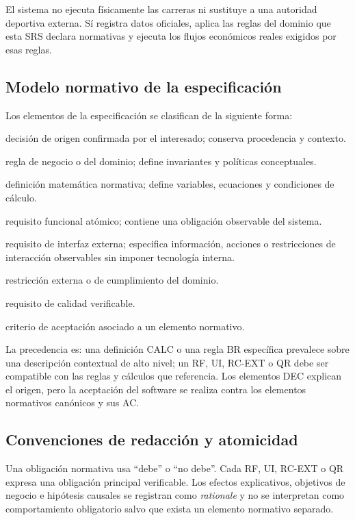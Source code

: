 \documentclass[10pt,letterpaper]{article}
\begin{document}
El sistema no ejecuta físicamente las carreras ni sustituye a una autoridad deportiva externa. Sí registra datos oficiales, aplica las reglas del dominio que esta SRS declara normativas y ejecuta los flujos económicos reales exigidos por esas reglas.

\subsection{Modelo normativo de la especificación}
Los elementos de la especificación se clasifican de la siguiente forma:
\begin{description}[style=nextline,leftmargin=2.8cm,labelwidth=2.45cm]
\item[DEC] decisión de origen confirmada por el interesado; conserva procedencia y contexto.
\item[BR] regla de negocio o del dominio; define invariantes y políticas conceptuales.
\item[CALC] definición matemática normativa; define variables, ecuaciones y condiciones de cálculo.
\item[RF] requisito funcional atómico; contiene una obligación observable del sistema.
\item[UI] requisito de interfaz externa; especifica información, acciones o restricciones de interacción observables sin imponer tecnología interna.
\item[RC-EXT] restricción externa o de cumplimiento del dominio.
\item[QR] requisito de calidad verificable.
\item[AC] criterio de aceptación asociado a un elemento normativo.
\end{description}

La precedencia es: una definición CALC o una regla BR específica prevalece sobre una descripción contextual de alto nivel; un RF, UI, RC-EXT o QR debe ser compatible con las reglas y cálculos que referencia. Los elementos DEC explican el origen, pero la aceptación del software se realiza contra los elementos normativos canónicos y sus AC.

\subsection{Convenciones de redacción y atomicidad}
Una obligación normativa usa ``debe'' o ``no debe''. Cada RF, UI, RC-EXT o QR expresa una obligación principal verificable. Los efectos explicativos, objetivos de negocio e hipótesis causales se registran como \emph{rationale} y no se interpretan como comportamiento obligatorio salvo que exista un elemento normativo separado.
\end{document}
